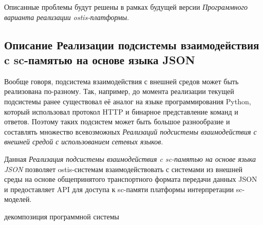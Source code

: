 Описанные проблемы будут решены в рамках будущей версии \textit{Программного варианта реализации ostis-платформы}.

\subsection{Описание Реализации подсистемы взаимодействия c sc-памятью на основе языка JSON}

Вообще говоря, подсистема взаимодействия с внешней средов может быть реализована по-разному. Так, например, до момента реализации текущей подсистемы ранее существовал её аналог на языке программирования Python, который использовал протокол HTTP и бинарное представление команд и ответов.
Поэтому таких подсистем может быть большое разнообразие и составлять множество всевозможных \textit{Реализаций подсистемы взаимодействия с внешней средой с использованием сетевых языков}.

Данная \textit{Реализация подсистемы взаимодействия c sc-памятью на основе языка JSON} позволяет ostis-системам взаимодействовать с системами из внешней среды на основе общепринятого транспортного формата передачи данных JSON и предоставляет API для доступа к sc-памяти платформы интерпретации sc-моделей.

\begin{SCn}
\begin{scnrelfromset}{декомпозиция программной системы}
\end{scnrelfromset}
\end{SCn}

